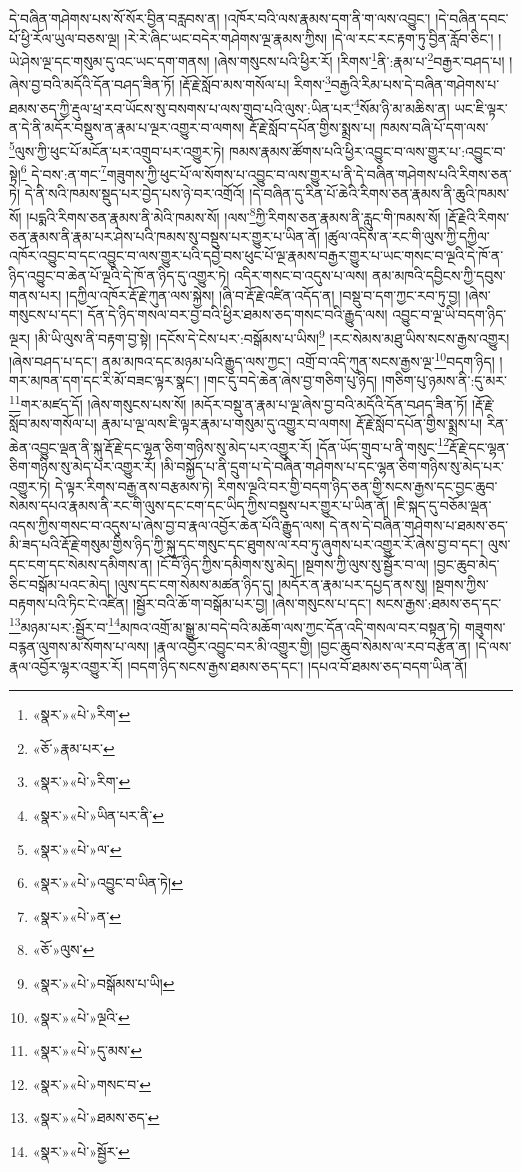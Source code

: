 དེ་བཞིན་གཤེགས་པས་སོ་སོར་བྱིན་བརླབས་ན། །འཁོར་བའི་ལས་རྣམས་དག་ནི་ག་ལས་འབྱུང་། །དེ་བཞིན་དབང་པོ་ཕྱི་རོལ་ཡུལ་བཅས་ལྔ། །རེ་རེ་ཞིང་ཡང་བདེར་གཤེགས་ལྔ་རྣམས་ཀྱིས། །དེ་ལ་རང་རང་རྟག་ཏུ་བྱིན་རློབ་ཅིང་། །ཡེ་ཤེས་ལྔ་དང་གསུམ་དུ་འང་ཡང་དག་གནས། །ཞེས་གསུངས་པའི་ཕྱིར་རོ། །རིགས་\footnote{«སྣར་»«པེ་»རིག་}ནི་:རྣམ་པ་\footnote{«ཅོ་»རྣམ་པར་}བརྒྱར་བཤད་པ། །ཞེས་བྱ་བའི་མདོའི་དོན་བཤད་ཟིན་ཏོ། །རྡོ་རྗེ་སློབ་མས་གསོལ་པ། རིགས་\footnote{«སྣར་»«པེ་»རིག་}བརྒྱའི་རིམ་པས་དེ་བཞིན་གཤེགས་པ་ཐམས་ཅད་ཀྱི་རྡུལ་ཕྲ་རབ་ཡོངས་སུ་བསགས་པ་ལས་གྲུབ་པའི་ལུས་:ཡིན་པར་\footnote{«སྣར་»«པེ་»ཡིན་པར་ནི་}སོམ་ཉི་མ་མཆིས་ན། ཡང་ཇི་ལྟར་ན་དེ་ནི་མདོར་བསྡུས་ན་རྣམ་པ་ལྔར་འགྱུར་བ་ལགས། རྡོ་རྗེ་སློབ་དཔོན་གྱིས་སྨྲས་པ། ཁམས་བཞི་པོ་དག་ལས་\footnote{«སྣར་»«པེ་»ལ་}ལུས་ཀྱི་ཕུང་པོ་མངོན་པར་འགྲུབ་པར་འགྱུར་ཏེ། ཁམས་རྣམས་ཚོགས་པའི་ཕྱིར་འབྱུང་བ་ལས་གྱུར་པ་:འབྱུང་བ་སྟེ།\footnote{«སྣར་»«པེ་»འབྱུང་བ་ཡིན་ཏེ།} དེ་བས་:ན་གང་\footnote{«སྣར་»«པེ་»ན་}གཟུགས་ཀྱི་ཕུང་པོ་ལ་སོགས་པ་འབྱུང་བ་ལས་གྱུར་པ་ནི་དེ་བཞིན་གཤེགས་པའི་རིགས་ཅན་ཏེ། དེ་ནི་སའི་ཁམས་སྡུད་པར་བྱེད་པས་ཉེ་བར་འགྲོའོ། །དེ་བཞིན་དུ་རིན་པོ་ཆེའི་རིགས་ཅན་རྣམས་ནི་ཆུའི་ཁམས་སོ། །པདྨའི་རིགས་ཅན་རྣམས་ནི་མེའི་ཁམས་སོ། །ལས་\footnote{«ཅོ་»ལུས་}ཀྱི་རིགས་ཅན་རྣམས་ནི་རླུང་གི་ཁམས་སོ། །རྡོ་རྗེའི་རིགས་ཅན་རྣམས་ནི་རྣམ་པར་ཤེས་པའི་ཁམས་སུ་བསྡུས་པར་གྱུར་པ་ཡིན་ནོ། །ཚུལ་འདིས་ན་རང་གི་ལུས་ཀྱི་དཀྱིལ་འཁོར་འབྱུང་བ་དང་འབྱུང་བ་ལས་གྱུར་པའི་དབྱེ་བས་ཕུང་པོ་ལྔ་རྣམས་བརྒྱར་གྱུར་པ་ཡང་གསང་བ་ལྔའི་དེ་ཁོ་ན་ཉིད་འབྱུང་བ་ཆེན་པོ་ལྔའི་དེ་ཁོ་ན་ཉིད་དུ་འགྱུར་ཏེ། འདིར་གསང་བ་འདུས་པ་ལས། ནམ་མཁའི་དབྱིངས་ཀྱི་དབུས་གནས་པར། །དཀྱིལ་འཁོར་རྡོ་རྗེ་ཀུན་ལས་སྐྱེས། །ཞི་བ་རྡོ་རྗེ་འཛིན་འདོད་ན། །བསྡུ་བ་དག་ཀྱང་རབ་ཏུ་བྱ། །ཞེས་གསུངས་པ་དང་། དོན་དེ་ཉིད་གསལ་བར་བྱ་བའི་ཕྱིར་ཐམས་ཅད་གསང་བའི་རྒྱུད་ལས། འབྱུང་བ་ལྔ་ཡི་བདག་ཉིད་ལྔར། །མི་ཡི་ལུས་ནི་བརྟག་བྱ་སྟེ། །དངོས་དེ་ངེས་པར་:བསྒོམས་པ་ཡིས།\footnote{«སྣར་»«པེ་»བསྒོམས་པ་ཡི།} །རང་སེམས་མཐུ་ཡིས་སངས་རྒྱས་འགྱུར། །ཞེས་བཤད་པ་དང་། ནམ་མཁའ་དང་མཉམ་པའི་རྒྱུད་ལས་ཀྱང་། འགྲོ་བ་འདི་ཀུན་སངས་རྒྱས་ལྔ་\footnote{«སྣར་»«པེ་»ལྔའི་}བདག་ཉིད། །གར་མཁན་དག་དང་རི་མོ་བཟང་ལྟར་སྣང་། །གང་དུ་བདེ་ཆེན་ཞེས་བྱ་གཅིག་པུ་ཉིད། །གཅིག་པུ་ཉམས་ནི་:དུ་མར་\footnote{«སྣར་»«པེ་»དུ་མས་}གར་མཛད་དོ། །ཞེས་གསུངས་པས་སོ། །མདོར་བསྡུ་ན་རྣམ་པ་ལྔ་ཞེས་བྱ་བའི་མདོའི་དོན་བཤད་ཟིན་ཏོ། །རྡོ་རྗེ་སློབ་མས་གསོལ་པ། རྣམ་པ་ལྔ་ལས་ཇི་ལྟར་རྣམ་པ་གསུམ་དུ་འགྱུར་བ་ལགས། རྡོ་རྗེ་སློབ་དཔོན་གྱིས་སྨྲས་པ། རིན་ཆེན་འབྱུང་ལྡན་ནི་སྐུ་རྡོ་རྗེ་དང་ལྷན་ཅིག་གཉིས་སུ་མེད་པར་འགྱུར་རོ། །དོན་ཡོད་གྲུབ་པ་ནི་གསུང་\footnote{«སྣར་»«པེ་»གསང་བ་}རྡོ་རྗེ་དང་ལྷན་ཅིག་གཉིས་སུ་མེད་པར་འགྱུར་རོ། །མི་བསྐྱོད་པ་ནི་དྲུག་པ་དེ་བཞིན་གཤེགས་པ་དང་ལྷན་ཅིག་གཉིས་སུ་མེད་པར་འགྱུར་ཏེ། དེ་ལྟར་རིགས་བརྒྱ་ནས་བརྩམས་ཏེ། རིགས་ལྔའི་བར་གྱི་བདག་ཉིད་ཅན་གྱི་སངས་རྒྱས་དང་བྱང་ཆུབ་སེམས་དཔའ་རྣམས་ནི་རང་གི་ལུས་དང་ངག་དང་ཡིད་ཀྱིས་བསྡུས་པར་གྱུར་པ་ཡིན་ནོ། །ཇི་སྐད་དུ་བཅོམ་ལྡན་འདས་ཀྱིས་གསང་བ་འདུས་པ་ཞེས་བྱ་བ་རྣལ་འབྱོར་ཆེན་པོའི་རྒྱུད་ལས། དེ་ནས་དེ་བཞིན་གཤེགས་པ་ཐམས་ཅད་མི་ཟད་པའི་རྡོ་རྗེ་གསུམ་གྱིས་ཉིད་ཀྱི་སྐུ་དང་གསུང་དང་ཐུགས་ལ་རབ་ཏུ་ཞུགས་པར་འགྱུར་རོ་ཞེས་བྱ་བ་དང་། ལུས་དང་ངག་དང་སེམས་དམིགས་ན། །ངོ་བོ་ཉིད་ཀྱིས་དམིགས་སུ་མེད། །སྔགས་ཀྱི་ལུས་སུ་སྦྱོར་བ་ལ། །བྱང་ཆུབ་མེད་ཅིང་བསྒོམ་པའང་མེད། །ལུས་དང་ངག་སེམས་མཚན་ཉིད་དུ། །མདོར་ན་རྣམ་པར་དཔྱད་ནས་སུ། །སྔགས་ཀྱིས་བརྟགས་པའི་ཏིང་ངེ་འཛིན། །སྦྱོར་བའི་ཆོ་ག་བསྒོམ་པར་བྱ། །ཞེས་གསུངས་པ་དང་། སངས་རྒྱས་:ཐམས་ཅད་དང་\footnote{«སྣར་»«པེ་»ཐམས་ཅད་}མཉམ་པར་:སྦྱོར་བ་\footnote{«སྣར་»«པེ་»སྦྱོར་}མཁའ་འགྲོ་མ་སྒྱུ་མ་བདེ་བའི་མཆོག་ལས་ཀྱང་དོན་འདི་གསལ་བར་བསྟན་ཏེ། གཟུགས་བརྙན་ལུགས་མ་སོགས་པ་ལས། །རྣལ་འབྱོར་འབྱུང་བར་མི་འགྱུར་གྱི། །བྱང་ཆུབ་སེམས་ལ་རབ་བརྩོན་ན། །དེ་ལས་རྣལ་འབྱོར་ལྷར་འགྱུར་རོ། །བདག་ཉིད་སངས་རྒྱས་ཐམས་ཅད་དང་། །དཔའ་བོ་ཐམས་ཅད་བདག་ཡིན་ནོ། 